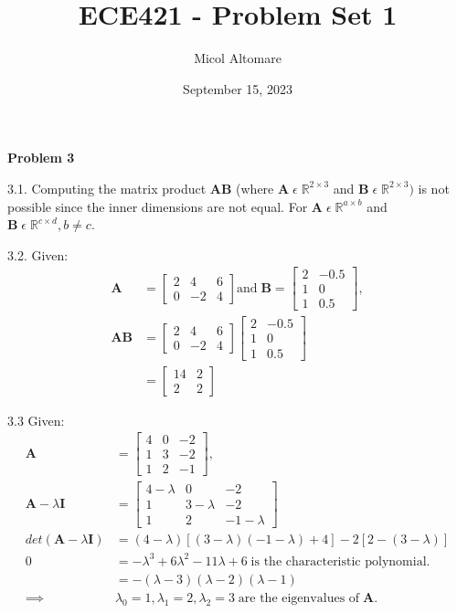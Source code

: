 \documentclass{article}
\title{ECE421 - Problem Set 1}
\author{Micol Altomare}
\date{September 15, 2023}
\begin{document}
	\maketitle
\textbf{Problem 3}

\hfill

3.1. Computing the matrix product \textbf{AB} (where $\mathbf{A} \; \epsilon \; \mathbb{R}^{2 \times 3}$ and $\mathbf{B} \; \epsilon \; \mathbb{R}^{2 \times 3})$ is not possible since the inner dimensions are not equal. For $\mathbf{A} \; \epsilon \; \mathbb{R}^{a \times b}$ and $\mathbf{B} \; \epsilon \; \mathbb{R}^{c \times d}, b \neq c$.

\hfill

3.2. Given:
\begin{align*}
\mathbf{A} &= \begin{bmatrix} 2 & 4 & 6\\ 0 & -2 & 4 \end{bmatrix}
\text{and} \;  
\mathbf{B} = \begin{bmatrix} 2 & -0.5 \\ 1 & 0 \\ 1 & 0.5 \end{bmatrix}, \\
\mathbf{AB} &= \begin{bmatrix} 2 & 4 & 6\\ 0 & -2 & 4 \end{bmatrix}  \begin{bmatrix} 2 & -0.5 \\ 1 & 0 \\ 1 & 0.5 \end{bmatrix} \\
&= \begin{bmatrix} 14 & 2 \\ 2 & 2 \end{bmatrix}
\end{align*}


\hfill

3.3 Given:
\begin{align*}
\mathbf{A} &= \begin{bmatrix} 4 & 0 & -2\\ 1 & 3 & -2 \\ 1 & 2 & -1 \end{bmatrix}, \\
\mathbf{A} - \lambda \mathbf{I} &= \begin{bmatrix} 4 - \lambda & 0 & -2\\ 1 & 3-\lambda & -2 \\ 1 & 2 & -1-\lambda \end{bmatrix} \\
det(\mathbf{A} - \lambda \mathbf{I}) &= (4-\lambda)[(3-\lambda)(-1-\lambda)+4]-2[2-(3-\lambda)] \\
0 &= \boxed{-\lambda^3 + 6\lambda^2 - 11\lambda + 6} \; \text{is the characteristic polynomial}. \\
&= -(\lambda-3)(\lambda-2)(\lambda-1) \\
\implies & \boxed{\lambda_0 = 1, \lambda_1 = 2, \lambda_2 = 3} \; \text{are the eigenvalues of} \; \mathbf{A}.
\end{align*}
\end{document}
